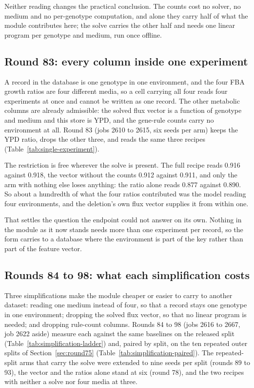 Neither reading changes the practical conclusion. The counts cost no solver, no medium
and no per-genotype computation, and alone they carry half of what the module contributes
here; the solve carries the other half and needs one linear program per genotype and
medium, run once offline.



\subsection{Round 83: every column inside one experiment}
\label{sec:round83}

A record in the database is one genotype in one environment, and the four FBA growth
ratios are four different media, so a cell carrying all four reads four experiments at
once and cannot be written as one record. The other metabolic columns are already
admissible: the solved flux vector is a function of genotype and medium and this store is
YPD, and the gene-rule counts carry no environment at all. Round 83 (jobs 2610 to 2615,
six seeds per arm) keeps the YPD ratio, drops the other three, and reads the same three
recipes (Table~\ref{tab:single-experiment}).

The restriction is free wherever the solve is present. The full recipe reads 0.916 against
0.918, the vector without the counts 0.912 against 0.911, and only the arm with nothing
else loses anything: the ratio alone reads 0.877 against 0.890. So about a hundredth of
what the four ratios contributed was the model reading four environments, and the deletion's
own flux vector supplies it from within one.

That settles the question the endpoint could not answer on its own. Nothing in the module
as it now stands needs more than one experiment per record, so the form carries to a
database where the environment is part of the key rather than part of the feature vector.



\subsection{Rounds 84 to 98: what each simplification costs}
\label{sec:round84-98}

Three simplifications make the module cheaper or easier to carry to another dataset:
reading one medium instead of four, so that a record stays one genotype in one
environment; dropping the solved flux vector, so that no linear program is needed; and
dropping rule-count columns. Rounds 84 to 98 (jobs 2616 to 2667, job 2622 aside) measure each against the
same baselines on the released split (Table~\ref{tab:simplification-ladder}) and, paired
by split, on the ten repeated outer splits of Section~\ref{sec:round75}
(Table~\ref{tab:simplification-paired}). The repeated-split arms that carry the solve were
extended to nine seeds per split (rounds 89 to 93), the vector and the ratios alone stand
at six (round 78), and the two recipes with neither a solve nor four media at three.

